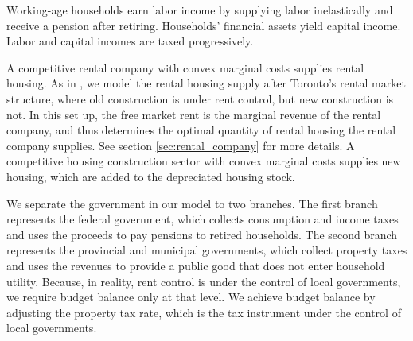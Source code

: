 \documentclass[parskip=full]{article}
\begin{document}

Working-age households earn labor income by supplying labor inelastically and receive a pension after retiring. Households' financial assets yield capital income. Labor and capital incomes are taxed progressively.

A competitive rental company with convex marginal costs supplies rental housing. As in \citet{fallis-1985}, we model the rental housing supply after Toronto's rental market structure, where old construction is under rent control, but new construction is not. In this set up, the free market rent is the marginal revenue of the rental company, and thus determines the optimal quantity of rental housing the rental company supplies. See section \ref{sec:rental_company} for more details. A competitive housing construction sector with convex marginal costs supplies new housing, which are added to the depreciated housing stock. 

We separate the government in our model to two branches. The first branch represents the federal government, which collects consumption and income taxes and uses the proceeds to pay pensions to retired households. The second branch represents the provincial and municipal governments, which collect property taxes and uses the revenues to provide a public good that does not enter household utility. Because, in reality, rent control is under the control of local governments, we require budget balance only at that level. We achieve budget balance by adjusting the property tax rate, which is the tax instrument under the control of local governments.
\end{document}
